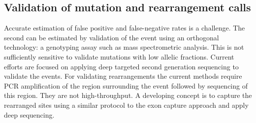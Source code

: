 	\subsection{Validation of mutation and rearrangement calls}
	Accurate estimation of false positive and false-negative rates is a challenge.
	The second can be estimated by validation of the event using an orthogonal technology: a genotyping assay such as mass spectrometric analysis.
	This is not sufficiently sensitive to validate mutations with low allelic fractions.
	Current efforts are focused on applying deep targeted second generation sequencing to validate the events.
	For validating rearrangements the current methods require PCR amplification of the region surrounding the event followed by sequencing of this region.
	They are not high-throughput.
	A developing concept is to capture the rearranged sites using a similar protocol to the exon capture approach and apply deep sequencing.
